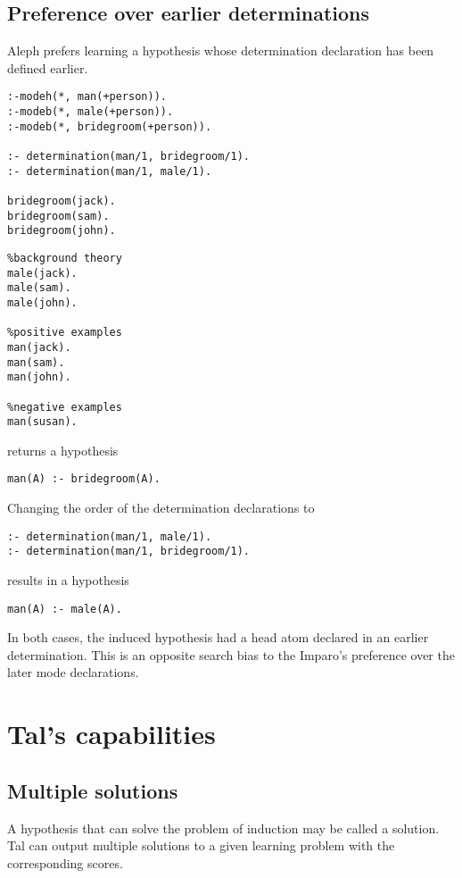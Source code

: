 \subsection{Preference over earlier determinations}
Aleph prefers learning a hypothesis whose determination declaration has been defined earlier.

\begin{minipage}[t]{.60\textwidth}
\begin{lstlisting}
:-modeh(*, man(+person)).
:-modeb(*, male(+person)).
:-modeb(*, bridegroom(+person)).

:- determination(man/1, bridegroom/1).
:- determination(man/1, male/1).

bridegroom(jack).
bridegroom(sam).
bridegroom(john).
\end{lstlisting}
\end{minipage}
\begin{minipage}[t]{.20\textwidth}
\begin{lstlisting}
%background theory
male(jack).
male(sam).
male(john).

%positive examples
man(jack).
man(sam).
man(john).

%negative examples
man(susan).
\end{lstlisting}
\end{minipage}

returns a hypothesis
\begin{lstlisting}
man(A) :- bridegroom(A).
\end{lstlisting}

Changing the order of the determination declarations to
\begin{lstlisting}
:- determination(man/1, male/1).
:- determination(man/1, bridegroom/1).
\end{lstlisting}
results in a hypothesis
\begin{lstlisting}
man(A) :- male(A).
\end{lstlisting}
In both cases, the induced hypothesis had a head atom declared in an earlier determination. This is an opposite search bias to the Imparo's preference over the later mode declarations.

\section{Tal's capabilities}

\subsection{Multiple solutions}
A hypothesis that can solve the problem of induction may be called a solution. Tal can output multiple solutions to a given learning problem with the corresponding scores.

